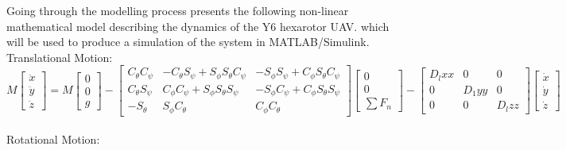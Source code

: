 \documentclass[12pt,a4paper,twoside]{report}
\begin{document}
			Going through the modelling process presents the following non-linear mathematical model describing the dynamics of the Y6 hexarotor UAV. which will be used to produce a simulation of the system in MATLAB/Simulink.
			\\
			Translational Motion:
			\\ 
			$$ 
			M 
			\begin{bmatrix}
			\ddot{x} \\
			\ddot{y} \\
			\ddot{z}
			\end{bmatrix}
			=
			M 
			\begin{bmatrix}
			0 \\
			0 \\
			g
			\end{bmatrix}
			-
			\begin{bmatrix}
			C_\theta C_\psi & -C_\theta S_\psi + S_\phi S_\theta C_\psi & -S_\phi S_\psi + C_\phi S_\theta C_\psi \\
			C_\theta S_\psi &  C_\phi C_\psi + S_\phi S_\theta S_\psi   & -S_\phi C_\psi + C_\phi S_\theta S_\psi \\
			-S_\theta       &  S_\phi C_\theta                          &  C_\phi C_\theta
			\end{bmatrix}
			\begin{bmatrix}
			0 \\
			0 \\
			\sum F_n 
			\end{bmatrix}
			-
			\begin{bmatrix}
			D_lxx & 0 & 0 \\
			0 & D_1yy & 0 \\
			0 & 0 & D_lzz
			\end{bmatrix}
			\begin{bmatrix}
			\dot{x} \\
			\dot{y} \\
			\dot{z} 
			\end{bmatrix}
			$$ 
			\\
			Rotational Motion:
			\\
\end{document}
